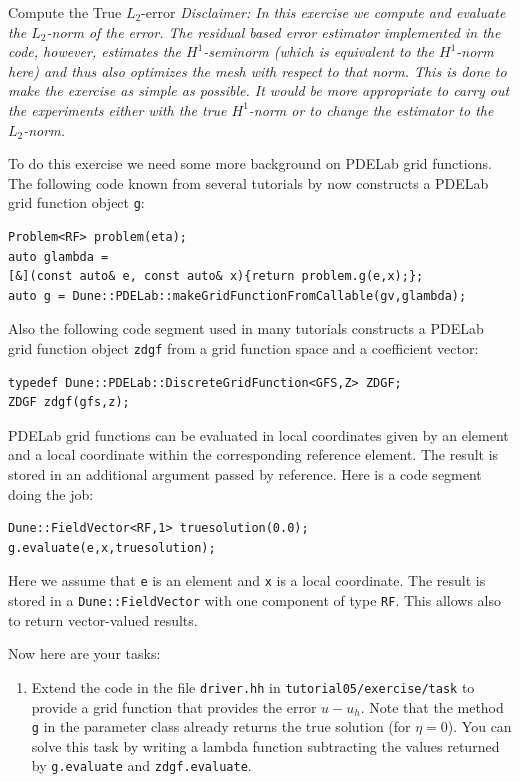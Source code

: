 \documentclass[12pt,a4paper]{article}
\begin{document}
\begin{Exercise}{Compute the True $L_2$-error}
  \textit{Disclaimer: In this exercise we compute and evaluate the
    $L_2$-norm of the error. The residual based error estimator
    implemented in the code, however, estimates the $H^1$-seminorm
    (which is equivalent to the $H^1$-norm here) and thus also
    optimizes the mesh with respect to that norm.  This is done to
    make the exercise as simple as possible. It would be more
    appropriate to carry out the experiments either with the true
    $H^1$-norm or to change the estimator to the $L_2$-norm.}

  To do this exercise we need some more background on PDELab grid
  functions.  The following code known from several tutorials by now
  constructs a PDELab grid function object \lstinline{g}:
  \begin{lstlisting}[basicstyle=\ttfamily\small,
    frame=single,
    backgroundcolor=\color{listingbg}]
Problem<RF> problem(eta);
auto glambda =
[&](const auto& e, const auto& x){return problem.g(e,x);};
auto g = Dune::PDELab::makeGridFunctionFromCallable(gv,glambda);
    \end{lstlisting}
    Also the following code segment used in many tutorials constructs
    a PDELab grid function object \lstinline{zdgf} from a grid
    function space and a coefficient vector:
    \begin{lstlisting}[basicstyle=\ttfamily\small,
frame=single,
backgroundcolor=\color{listingbg}]
typedef Dune::PDELab::DiscreteGridFunction<GFS,Z> ZDGF;
ZDGF zdgf(gfs,z);
    \end{lstlisting}
    PDELab grid functions can be evaluated in local coordinates given
    by an element and a local coordinate within the corresponding
    reference element.  The result is stored in an additional argument
    passed by reference.  Here is a code segment doing the job:
    \begin{lstlisting}[basicstyle=\ttfamily\small,
frame=single,
backgroundcolor=\color{listingbg}]
Dune::FieldVector<RF,1> truesolution(0.0);
g.evaluate(e,x,truesolution);
    \end{lstlisting}
    Here we assume that \lstinline{e} is an element and \lstinline{x}
    is a local coordinate.  The result is stored in a
    \lstinline{Dune::FieldVector} with one component of type
    \lstinline{RF}. This allows also to return vector-valued results.

    Now here are your tasks:
    \begin{enumerate}
    \item Extend the code in the file \lstinline{driver.hh} in
      \lstinline{tutorial05/exercise/task} to provide a grid function
      that provides the error $u-u_h$. Note that the method
      \lstinline{g} in the parameter class already returns the true
      solution (for $\eta=0$).  You can solve this task by writing a
      lambda function subtracting the values returned by
      \lstinline{g.evaluate} and \lstinline{zdgf.evaluate}.


\end{enumerate}
\end{Exercise}
\end{document}
